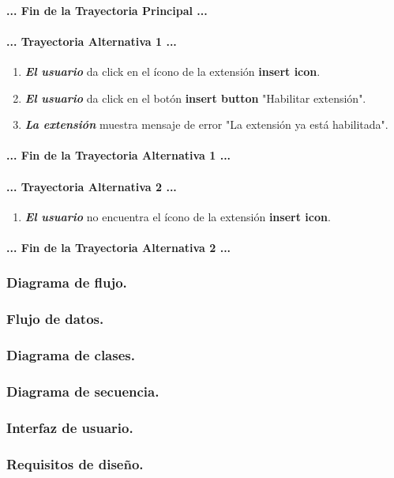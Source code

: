 \documentclass[12pt, a4paper, titlepage]{article}
\begin{document}
				\paragraph{... Fin de la Trayectoria Principal ...}
				
				\paragraph{... Trayectoria Alternativa 1 ...}
				\begin{enumerate}
					\item \textbf{\textit{El usuario}} da click en el ícono de la extensión \textbf{insert icon}.
					\item \textbf{\textit{El usuario}} da click en el botón \textbf{insert button} "Habilitar extensión".
					\item \textbf{\textit{La extensión}} muestra mensaje de error "La extensión ya está habilitada".
				\end{enumerate}
				\paragraph{... Fin de la Trayectoria Alternativa 1 ...}
				
				\paragraph{... Trayectoria Alternativa 2 ...}
				\begin{enumerate}
					\item \textbf{\textit{El usuario}} no encuentra el ícono de la extensión \textbf{insert icon}.
				\end{enumerate}
				\paragraph{... Fin de la Trayectoria Alternativa 2 ...}
			
				\newpage
				
			\subsubsection{Diagrama de flujo.}
			\subsubsection{Flujo de datos.}
			\subsubsection{Diagrama de clases.}
			\subsubsection{Diagrama de secuencia.}
			\subsubsection{Interfaz de usuario.}
			\subsubsection{Requisitos de diseño.}
			
\end{document}
